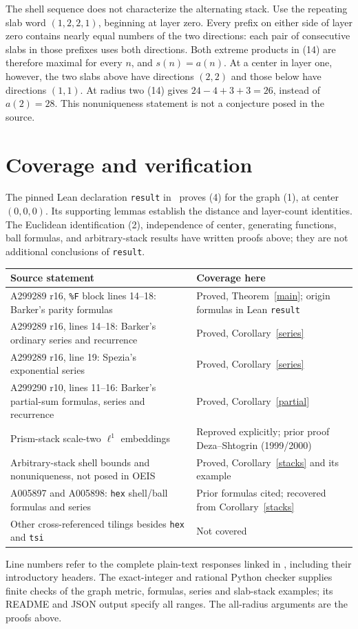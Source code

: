 \documentclass[10pt]{article}
\begin{document}
The shell sequence does not characterize the alternating stack.
Use the repeating slab word $(1,2,2,1)$, beginning at layer zero.
Every prefix on either side of layer zero contains nearly equal
numbers of the two directions:
each pair of consecutive slabs in those prefixes uses both directions.
Both extreme products in (14) are therefore maximal for every $n$,
and $s(n)=a(n)$. At a center in layer one, however, the two slabs
above have directions $(2,2)$ and those below have directions $(1,1)$.
At radius two (14) gives $24-4+3+3=26$, instead of $a(2)=28$.
This nonuniqueness statement is not a conjecture posed in the source.

\section{Coverage and verification}
The pinned Lean declaration \texttt{result} in~\cite{lean} proves (4)
for the graph (1), at center $(0,0,0)$.
Its supporting lemmas establish the distance and layer-count identities.
The Euclidean identification (2), independence of center, generating
functions, ball formulas, and arbitrary-stack results have written
proofs above; they are not additional conclusions of \texttt{result}.
\begin{center}
\small
\begin{tabular}{@{}p{.48\linewidth}p{.43\linewidth}@{}}
\toprule
Source statement & Coverage here\\
\midrule
A299289 r16, \texttt{\%F} block lines 14--18: Barker's parity formulas & Proved, Theorem~\ref{main}; origin formulas in Lean \texttt{result}\\
A299289 r16, lines 14--18: Barker's ordinary series and recurrence & Proved, Corollary~\ref{series}\\
A299289 r16, line 19: Spezia's exponential series & Proved, Corollary~\ref{series}\\
A299290 r10, lines 11--16: Barker's partial-sum formulas, series and recurrence & Proved, Corollary~\ref{partial}\\
Prism-stack scale-two $\ell^1$ embeddings & Reproved explicitly; prior proof Deza--Shtogrin (1999/2000)\\
Arbitrary-stack shell bounds and nonuniqueness, not posed in OEIS & Proved, Corollary~\ref{stacks} and its example\\
A005897 and A005898: \texttt{hex} shell/ball formulas and series & Prior formulas cited; recovered from Corollary~\ref{stacks}\\
Other cross-referenced tilings besides \texttt{hex} and \texttt{tsi} & Not covered\\
\bottomrule
\end{tabular}
\end{center}
Line numbers refer to the complete plain-text responses linked in
\cite{oeis,balls}, including their introductory headers.
The exact-integer and rational Python checker supplies finite checks
of the graph metric, formulas, series and slab-stack examples; its
README and JSON output specify all ranges. The all-radius arguments
are the proofs above.
\end{document}
